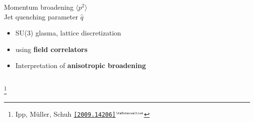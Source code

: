 \documentclass[aspectratio=169,11pt,usenames,dvipsnames]{beamer}
\renewcommand{\thefootnote}{\color{customblue}\faPaperPlaneO}
\newcommand\blfootnote[1]{%
  \begingroup
  \renewcommand\thefootnote{}\footnote{#1}%
  \addtocounter{footnote}{-1}%
  \endgroup
}
\begin{document}
\begin{frame}[t]
\begin{columns}[onlytextwidth,t]
        \begin{center}
            {\Large\color{palteal} Momentum broadening $\langle p^2\rangle$ \\[5pt] Jet quenching parameter $\hat{q}$\\[10pt]}
            \footnotesize
                \begin{itemize}
                    \item {\color{lightgray}SU(3) glasma, lattice discretization}
                    \item {\color{lightgray}{\bfseries Eikonal jets} using {\bfseries field correlators}}
                     \item {\color{lightgray}Interpretation of {\bfseries anisotropic broadening}}
                \end{itemize}
        \end{center}
    \end{columns}
    \blfootnote{\scriptsize Ipp, Müller, Schuh \href{https://arxiv.org/abs/2009.14206}{\color{palgold}\texttt{[2009.14206]}$^\text{\tiny\faExternalLink}$}}
\end{frame}


\end{document}
